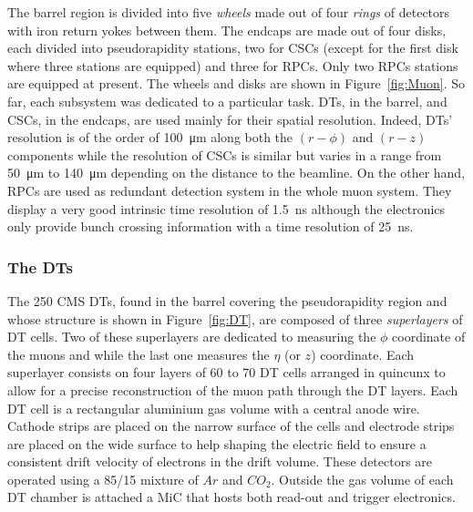 	The barrel region is divided into five \textit{wheels} made out of four \textit{rings} of detectors with iron return yokes between them. The endcaps are made out of four disks, each divided into pseudorapidity stations, two for CSCs (except for the first disk where three stations are equipped) and three for RPCs. Only two RPCs stations are equipped at present. The wheels and disks are shown in Figure~\ref{fig:Muon}. So far, each subsystem was dedicated to a particular task. DTs, in the barrel, and CSCs, in the endcaps, are used mainly for their spatial resolution. Indeed, DTs' resolution is of the order of \SI{100}{\micro m} along both the $(r-\phi)$ and $(r-z)$ components while the resolution of CSCs is similar but varies in a range from \SI{50}{\micro m} to \SI{140}{\micro m} depending on the distance to the beamline. On the other hand, RPCs are used as redundant detection system in the whole muon system. They display a very good intrinsic time resolution of \SI{1.5}{ns} although the electronics only provide bunch crossing information with a time resolution of \SI{25}{ns}.
	
		\subsubsection{The \acl{DT}s}
		\label{chapt4:sssec:DTs}
	
	The 250 CMS DTs, found in the barrel covering the pseudorapidity region  and whose structure is shown in Figure~\ref{fig:DT}, are composed of three \textit{superlayers} of DT cells. Two of these superlayers are dedicated to measuring the $\phi$ coordinate of the muons and while the last one measures the $\eta$ (or $z$) coordinate. Each superlayer consists on four layers of 60 to 70 DT cells arranged in quincunx to allow for a precise reconstruction of the muon path through the DT layers. Each DT cell is a rectangular aluminium gas volume with a central anode wire. Cathode strips are placed on the narrow surface of the cells and electrode strips are placed on the wide surface to help shaping the electric field to ensure a consistent drift velocity of electrons in the drift volume. These detectors are operated using a 85/15 mixture of $Ar$ and $CO_2$. Outside the gas volume of each DT chamber is attached a \acf{MiC} that hosts both read-out and trigger electronics.
	
